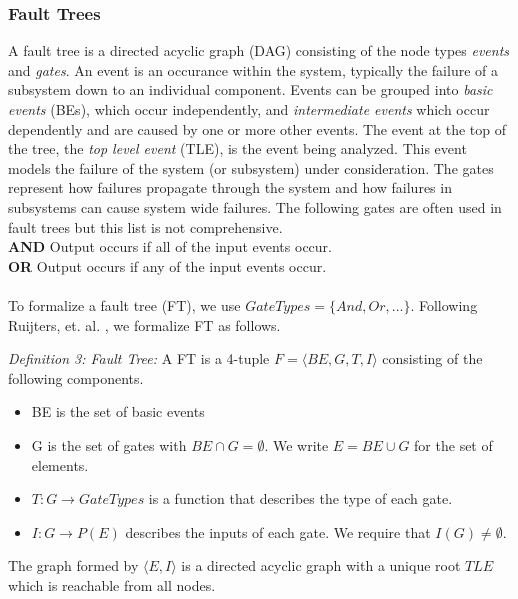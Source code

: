 \subsubsection{Fault Trees}
A fault tree is a directed acyclic graph (DAG) consisting of the node types \textit{events} and \textit{gates}. An event is an occurance within the system, typically the failure of a subsystem down to an individual component. Events can be grouped into \textit{basic events} (BEs), which occur independently, and \textit{intermediate events} which occur dependently and are caused by one or more other events. The event at the top of the tree, the \textit{top level event} (TLE), is the event being analyzed. This event models the failure of the system (or subsystem) under consideration. The gates represent how failures propagate through the system and how failures in subsystems can cause system wide failures. The following gates are often used in fault trees but this list is not comprehensive. \\
\textbf{AND} Output occurs if all of the input events occur.\\
\textbf{OR} Output occurs if any of the input events occur.\\

\\

To formalize a fault tree (FT), we use $GateTypes = \{And, Or, ...\}$. Following Ruijters, et. al. \cite{RuijtersSurvey}, we formalize FT as follows. 

\textit{Definition 3: Fault Tree:} A FT is a 4-tuple $F = \langle BE, G, T, I \rangle$ consisting of the following components. 
\begin{itemize}
\item BE is the set of basic events
\item G is the set of gates with $BE \cap G = \emptyset$. We write $E = BE \cup G$ for the set of elements.
\item $T: G \to GateTypes$ is a function that describes the type of each gate.
\item $I: G \to P(E)$ describes the inputs of each gate. We require that $I(G) \neq \emptyset$.
\end{itemize}

The graph formed by $\langle E, I \rangle$ is a directed acyclic graph with a unique root $TLE$ which is reachable from all nodes. 

